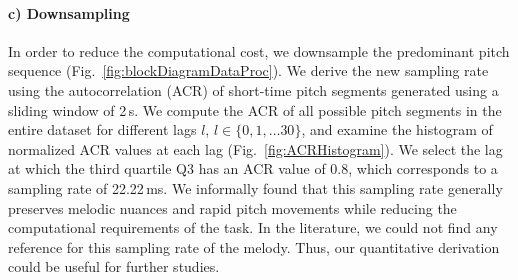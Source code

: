 \paragraph{c) Downsampling} In order to reduce the computational cost, we downsample the predominant pitch sequence (Fig.~\ref{fig:blockDiagramDataProc}). We derive the new sampling rate using the autocorrelation (ACR) of short-time pitch segments generated using a sliding window of 2\,s. We compute the ACR of all possible pitch segments in the entire dataset for different lags $l$, $l\in \lbrace0,1,\dots30\rbrace$, and examine the histogram of normalized ACR values at each lag (Fig.~\ref{fig:ACRHistogram}). %
We select the lag at which the third quartile Q3 has an ACR value of 0.8, which corresponds to a sampling rate of 22.22\,ms. We informally found that this sampling rate generally preserves melodic nuances and rapid pitch movements while reducing the computational requirements of the task. In the literature, we could not find any reference for this sampling rate of the melody. Thus, our quantitative derivation could be useful for further studies.



